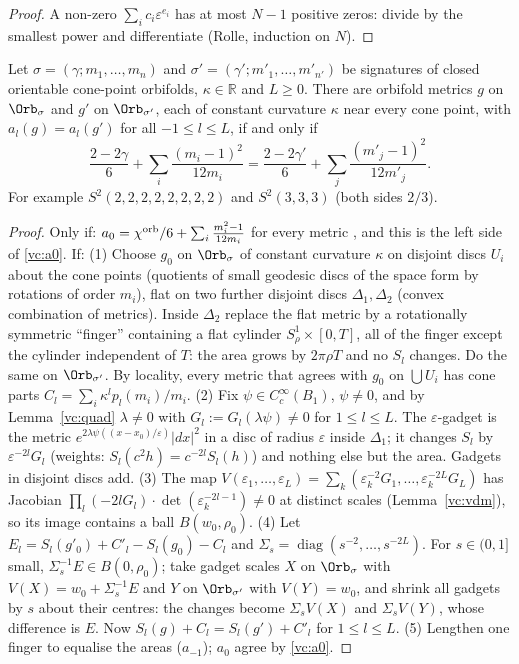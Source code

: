 \begin{proof}
A non-zero $\sum_ic_i\varepsilon^{e_i}$ has at most $N-1$ positive zeros: divide by the smallest power and
differentiate (Rolle, induction on $N$).
\end{proof}

\begin{theorem}\label{vc:VC5}
Let $\sigma=(\gamma;m_1,\dots,m_n)$ and $\sigma'=(\gamma';m'_1,\dots,m'_{n'})$ be signatures of closed
orientable cone-point orbifolds, $\kappa\in\mathbb R$ and $L\ge0$. There are orbifold metrics $g$ on
$\Orb_\sigma$ and $g'$ on $\Orb_{\sigma'}$, each of constant curvature $\kappa$ near every cone point, with
$a_l(g)=a_l(g')$ for all $-1\le l\le L$, if and only if
\begin{equation}\label{vc:a0}
\frac{2-2\gamma}6+\sum_i\frac{(m_i-1)^2}{12m_i}=\frac{2-2\gamma'}6+\sum_j\frac{(m'_j-1)^2}{12m'_j}.
\end{equation}
For example $S^2(2,2,2,2,2,2,2,2)$ and $S^2(3,3,3)$ (both sides $2/3$).
\end{theorem}

\begin{proof}
Only if: $a_0=\chi^{\rm orb}/6+\sum_i\frac{m_i^2-1}{12m_i}$ for every metric \cite[(5.7)]{dggw2008}, and this is
the left side of \eqref{vc:a0}.
If: (1) Choose $g_0$ on $\Orb_\sigma$ of constant curvature $\kappa$ on disjoint discs $U_i$ about the cone
points (quotients of small geodesic discs of the space form by rotations of order $m_i$), flat on two
further disjoint discs $\Delta_1,\Delta_2$ (convex combination of metrics). Inside $\Delta_2$ replace the flat
metric by a rotationally symmetric ``finger'' containing a flat cylinder $S^1_\rho\times[0,T]$, all of the
finger except the cylinder independent of $T$: the area grows by $2\pi\rho T$ and no $S_l$ changes.
Do the same on $\Orb_{\sigma'}$. By locality, every metric that agrees with $g_0$ on $\bigcup U_i$ has
cone parts $C_l=\sum_i\kappa^lp_l(m_i)/m_i$. (2) Fix $\psi\in C_c^\infty(B_1)$, $\psi\ne0$, and by
Lemma~\ref{vc:quad} $\lambda\ne0$ with $G_l:=G_l(\lambda\psi)\ne0$ for $1\le l\le L$. The
$\varepsilon$-gadget is the metric $e^{2\lambda\psi((x-x_0)/\varepsilon)}|dx|^2$ in a disc of radius $\varepsilon$
inside $\Delta_1$; it changes $S_l$ by $\varepsilon^{-2l}G_l$ (weights: $S_l(c^2h)=c^{-2l}S_l(h)$) and nothing
else but the area. Gadgets in disjoint discs add. (3) The map
$V(\varepsilon_1,\dots,\varepsilon_L)=\sum_k(\varepsilon_k^{-2}G_1,\dots,\varepsilon_k^{-2L}G_L)$ has Jacobian
$\prod_l(-2lG_l)\cdot\det(\varepsilon_k^{-2l-1})\ne0$ at distinct scales (Lemma~\ref{vc:vdm}), so its image
contains a ball $B(w_0,\rho_0)$. (4) Let $E_l=S_l(g'_0)+C'_l-S_l(g_0)-C_l$ and
$\Sigma_s=\operatorname{diag}(s^{-2},\dots,s^{-2L})$. For $s\in(0,1]$ small,
$\Sigma_s^{-1}E\in B(0,\rho_0)$; take gadget scales $X$ on $\Orb_\sigma$ with $V(X)=w_0+\Sigma_s^{-1}E$ and $Y$ on
$\Orb_{\sigma'}$ with $V(Y)=w_0$, and shrink all gadgets by $s$ about their centres: the changes become
$\Sigma_sV(X)$ and $\Sigma_sV(Y)$, whose difference is $E$. Now $S_l(g)+C_l=S_l(g')+C'_l$ for
$1\le l\le L$. (5) Lengthen one finger to equalise the areas ($a_{-1}$); $a_0$ agree by \eqref{vc:a0}.
\end{proof}

